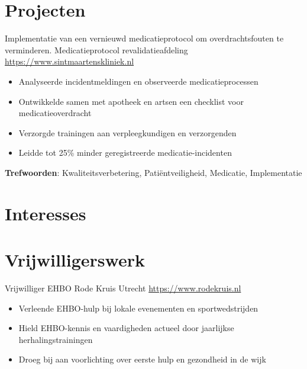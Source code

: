 \documentclass[a4paper, serif, 10pt]{moderncv}
\begin{document}
\section{Projecten}

        {Implementatie van een vernieuwd medicatieprotocol om overdrachtsfouten te verminderen.}
        {Medicatieprotocol revalidatieafdeling}
        {\url{https://www.sintmaartenskliniek.nl}}
        {}
        {\begin{itemize}
\item Analyseerde incidentmeldingen en observeerde medicatieprocessen
\item Ontwikkelde samen met apotheek en artsen een checklist voor medicatieoverdracht
\item Verzorgde trainingen aan verpleegkundigen en verzorgenden
\item Leidde tot 25\% minder geregistreerde medicatie-incidenten
\end{itemize}
\textbf{Trefwoorden}: Kwaliteitsverbetering, Patiëntveiligheid, Medicatie, Implementatie}
\section{Interesses}

\section{Vrijwilligerswerk}

        {Vrijwilliger EHBO}
        {Rode Kruis Utrecht}
        {\url{https://www.rodekruis.nl}}
        {}
        {\begin{itemize}
\item Verleende EHBO-hulp bij lokale evenementen en sportwedstrijden
\item Hield EHBO-kennis en vaardigheden actueel door jaarlijkse herhalingstrainingen
\item Droeg bij aan voorlichting over eerste hulp en gezondheid in de wijk
\end{itemize}}
    
\end{document}
